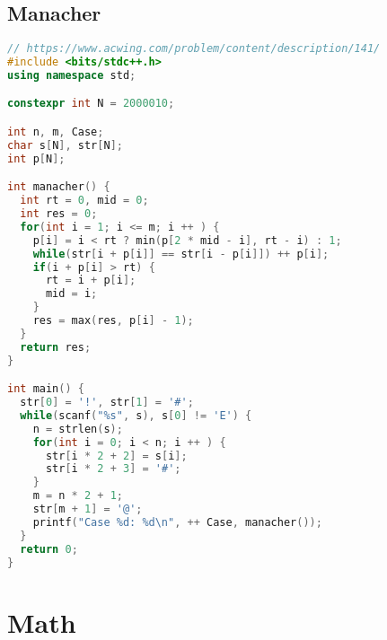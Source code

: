 \subsection{Manacher}
\begin{lstlisting}[language=C++]
// https://www.acwing.com/problem/content/description/141/
#include <bits/stdc++.h>
using namespace std;

constexpr int N = 2000010;

int n, m, Case;
char s[N], str[N];
int p[N];

int manacher() {
  int rt = 0, mid = 0;
  int res = 0;
  for(int i = 1; i <= m; i ++ ) {
    p[i] = i < rt ? min(p[2 * mid - i], rt - i) : 1;
    while(str[i + p[i]] == str[i - p[i]]) ++ p[i];
    if(i + p[i] > rt) {
      rt = i + p[i];
      mid = i;
    }
    res = max(res, p[i] - 1);
  }
  return res;
}

int main() {
  str[0] = '!', str[1] = '#';
  while(scanf("%s", s), s[0] != 'E') {
    n = strlen(s);
    for(int i = 0; i < n; i ++ ) {
      str[i * 2 + 2] = s[i];
      str[i * 2 + 3] = '#';
    }
    m = n * 2 + 1;
    str[m + 1] = '@';
    printf("Case %d: %d\n", ++ Case, manacher());
  }
  return 0;
}

\end{lstlisting}
\section{Math}
